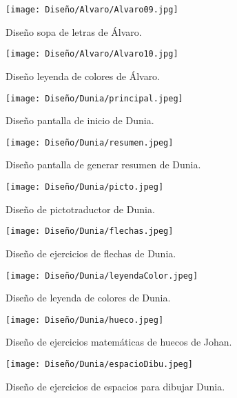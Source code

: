 \begin{figure}[ht!]
  \centering
  \texttt{[image: Diseño/Alvaro/Alvaro09.jpg]}
  \caption{Diseño sopa de letras de Álvaro.}
  \label{fig:disenyoAlvaro09}
\end{figure}

\begin{figure}[ht!]
  \centering
  \texttt{[image: Diseño/Alvaro/Alvaro10.jpg]}
  \caption{Diseño leyenda de colores de Álvaro.}
  \label{fig:disenyoAlvaro10}
\end{figure}

\begin{figure}[ht!]
  \centering
  \texttt{[image: Diseño/Dunia/principal.jpeg]}
  \caption{Diseño pantalla de inicio de Dunia.}
  \label{dunia1}
\end{figure}

\begin{figure}[ht!]
  \centering
  \texttt{[image: Diseño/Dunia/resumen.jpeg]}
  \caption{Diseño pantalla de generar resumen de Dunia.}
  \label{dunia2}
\end{figure}

\begin{figure}[ht!]
  \centering
  \texttt{[image: Diseño/Dunia/picto.jpeg]}
  \caption{Diseño de pictotraductor de Dunia.}
  \label{dunia3}
\end{figure}

\begin{figure}[ht!]
  \centering
  \texttt{[image: Diseño/Dunia/flechas.jpeg]}
  \caption{Diseño de ejercicios de flechas de Dunia.}
  \label{dunia4}
\end{figure}

\begin{figure}[ht!]
  \centering
  \texttt{[image: Diseño/Dunia/leyendaColor.jpeg]}
  \caption{Diseño de leyenda de colores de Dunia.}
  \label{dunia5}
\end{figure}

\begin{figure}[ht!]
  \centering
  \texttt{[image: Diseño/Dunia/hueco.jpeg]}
  \caption{Diseño de ejercicios matemáticas de huecos de Johan.}
  \label{dunia6}
\end{figure}

\begin{figure}[ht!]
  \centering
  \texttt{[image: Diseño/Dunia/espacioDibu.jpeg]}
  \caption{Diseño de ejercicios de espacios para dibujar Dunia.}
  \label{dunia7}
\end{figure}

